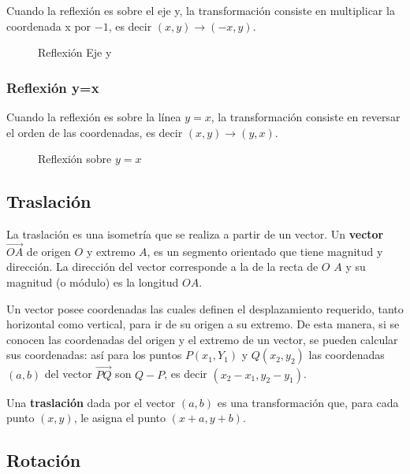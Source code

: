 Cuando la reflexión es sobre el eje y, la transformación consiste en multiplicar la coordenada x por $-1$, es decir $(x,y) \to (-x,y)$.

\begin{figure}[h]
    \centering
    
    \caption{Reflexión Eje y}
    \label{fig:reflexion-x-axis}
\end{figure}

\subsubsection{Reflexión y=x}

Cuando la reflexión es sobre la línea $y=x$, la transformación consiste en reversar el orden de las coordenadas, es decir $(x,y) \to (y,x)$.

\begin{figure}[h]
    \centering
    
    \caption{Reflexión sobre $y=x$}
    \label{fig:reflexion-y-x}
\end{figure}

\clearpage

\subsection{Traslación}

La traslación es una isometría que se realiza a partir de un vector. Un \textbf{vector} $\overrightarrow{OA}$ de origen $O$ y extremo $A$, es un segmento orientado que tiene magnitud y dirección. La dirección del vector corresponde a la de la recta de $O$ $A$ y su magnitud (o módulo) es la longitud $OA$.

Un vector posee coordenadas las cuales definen el desplazamiento requerido, tanto horizontal como vertical, para ir de su origen a su extremo. De esta manera, si se conocen las coordenadas del origen y el extremo de un vector, se pueden calcular sus coordenadas: así para los puntos $P(x_1,Y_1)$ y $Q(x_2,y_2)$ las coordenadas $(a,b)$ del vector $\overrightarrow{PQ}$ son $Q-P$, es decir $(x_2-x_1,y_2-y_1)$.

Una \textbf{traslación} dada por el vector $(a,b)$ es una transformación que, para cada punto $(x,y)$, le asigna el punto $(x + a, y + b)$.

\subsection{Rotación}

